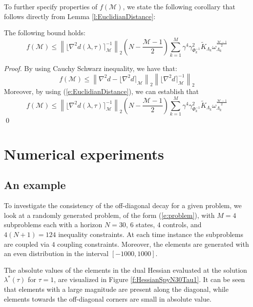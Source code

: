 To further specify properties of $f(\mathcal{M})$, we state the following corollary that follows directly from Lemma \ref{l:EuclidianDistance}:
\begin{corollary}
The following bound holds:
\begin{equation}
f(\mathcal{M}) \leq \left\| \lfloor \nabla^2 d(\lambda, \tau) \rceil_{\mathcal{M}}^{-1} \right\|_2 \left( N -\frac{\mathcal{M} - 1}{2} \right) \sum_{k=1}^M \gamma^4 \gamma_{\Phi_k^{-1}}^2 \tilde{K}_{\Lambda_k} \omega_{\Lambda_k}^{\frac{\mathcal{M} - 1}{2}}
\end{equation}
\end{corollary}
\begin{proof}
By using Cauchy Schwarz inequality, we have that:
\begin{equation}
f(\mathcal{M}) \leq \left\| \nabla^2 d -  \lfloor \nabla^2 d \rceil_{\mathcal{M}} \right\|_2  \left\|  \lfloor \nabla^2 d \rceil_{\mathcal{M}}^{-1} \right\|_2
\end{equation}
Moreover, by using (\ref{e:EuclidianDistance}), we can establish that
\begin{equation}
f(\mathcal{M}) \leq \left\| \lfloor \nabla^2 d(\lambda, \tau) \rceil_{\mathcal{M}}^{-1} \right\|_2 \left( N -\frac{\mathcal{M} - 1}{2} \right) \sum_{k=1}^M \gamma^4 \gamma_{\Phi_k^{-1}}^2 \tilde{K}_{\Lambda_k} \omega_{\Lambda_k}^{\frac{\mathcal{M} - 1}{2}}
\end{equation}
\qed
\end{proof}

\section{Numerical experiments}

\subsection{An example}
To investigate the consistency of the off-diagonal decay for a given problem, we look at a randomly generated problem, of the form (\ref{e:problem}), with $M=4$ subproblems each with a horizon $N=30$, $6$ states, $4$ controls, and $4(N+1) = 124$ inequality constraints. At each time instance the subproblems are coupled via $4$ coupling constraints. Moreover, the elements are generated with an even distribution in the interval $[-1000, 1000]$.

The absolute values of the elements in the dual Hessian evaluated at the solution $\lambda^*(\tau)$ for $\tau=1$, are visualized in Figure \ref{f:HessianSpyN30Tau1}. It can be seen that elements with a large magnitude are present along the diagonal, while elements towards the off-diagonal corners are small in absolute value.

